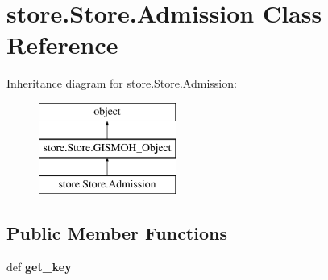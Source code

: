 \hypertarget{classstore_1_1_store_1_1_admission}{\section{store.\-Store.\-Admission Class Reference}
\label{classstore_1_1_store_1_1_admission}
}
Inheritance diagram for store.\-Store.\-Admission\-:\begin{figure}[H]
\begin{center}
\leavevmode
\includegraphics[height=3.000000cm]{classstore_1_1_store_1_1_admission}
\end{center}
\end{figure}
\subsection*{Public Member Functions}
\begin{DoxyCompactItemize}
\item 
\hypertarget{classstore_1_1_store_1_1_admission_a037f609d804b51df827032937ae763f5}{def {\bfseries get\-\_\-key}}\label{classstore_1_1_store_1_1_admission_a037f609d804b51df827032937ae763f5}

\end{DoxyCompactItemize}
